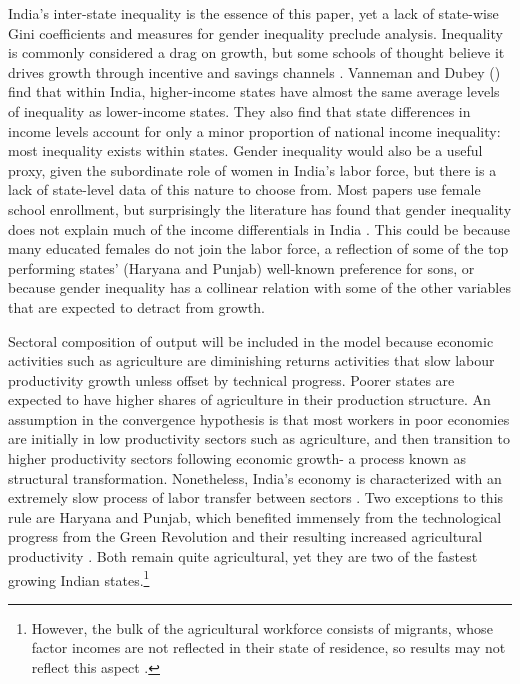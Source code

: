 \documentclass[a4paper, 11pt]{article}
\begin{document}
India’s inter-state inequality is the essence of this paper, yet a lack of state-wise Gini coefficients and measures for gender inequality preclude analysis.  Inequality is commonly considered a drag on growth, but some schools of thought believe it drives growth through incentive and savings channels \citep{stewart_income_2012}.  Vanneman and Dubey (\citeyear{vanneman2010horizontal}) find that within India, higher-income states have almost the same average levels of inequality as lower-income states.  They also find that state differences in income levels account for only a minor proportion of national income inequality: most inequality exists within states.  Gender inequality would also be a useful proxy, given the subordinate role of women in India’s labor force, but there is a lack of state-level data of this nature to choose from.  Most papers use female school enrollment, but surprisingly the literature has found that gender inequality does not explain much of the income differentials in India \citep{purfield_mind_2006,baddeley_divergence_2006}.  This could be because many educated females do not join the labor force, a reflection of some of the top performing states’ (Haryana and Punjab) well-known preference for sons, or because gender inequality has a collinear relation with some of the other variables that are expected to detract from growth.  \par
 Sectoral composition of output will be included in the model because economic activities such as agriculture are diminishing returns activities that slow labour productivity growth unless offset by technical progress.  Poorer states are expected to have higher shares of agriculture in their production structure.  An assumption in the convergence hypothesis is that most workers in poor economies are initially in low productivity sectors such as agriculture, and then transition to higher productivity sectors following economic growth- a process known as structural transformation.  Nonetheless, India’s economy is characterized with an extremely slow process of labor transfer between sectors \citep{jayanthakumaran_economic_2010,kotwal_economic_2011,topalova_trade_2005}.  Two exceptions to this rule are Haryana and Punjab, which benefited immensely from the technological progress from the Green Revolution and their resulting increased agricultural productivity \citep{baddeley_divergence_2006}.  Both remain quite agricultural, yet they are two of the fastest growing Indian states.\footnote{However, the bulk of the agricultural workforce consists of migrants, whose factor incomes are not reflected in their state of residence, so results may not reflect this aspect \citep{purfield_mind_2006}. }   \par
\end{document}
